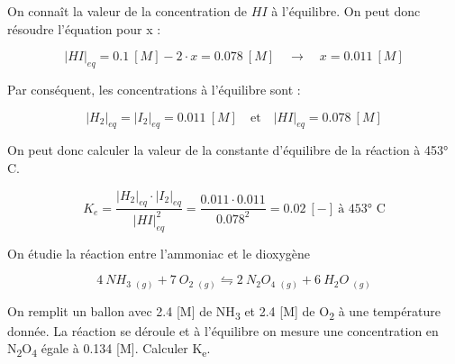 \documentclass[
  11pt,
  a4paper,
  openany]{book}
\begin{document}
On connaît la valeur de la concentration de \(HI\) à l'équilibre. On peut donc résoudre l'équation pour x :

\[
  |HI|_{eq} = 0.1\ [M] - 2 \cdot x = 0.078\ [M] \quad \rightarrow \quad x = 0.011\ [M]
\]

Par conséquent, les concentrations à l'équilibre sont :

\[
  |H_2|_{eq} = |I_2|_{eq} = 0.011\ [M] \quad \text{et} \quad |HI|_{eq} = 0.078\ [M]
\]

On peut donc calculer la valeur de la constante d'équilibre de la réaction à 453° C.

\[
  K_{e} = \frac{|H_2|_{eq} \cdot |I_2|_{eq}}{|HI|_{eq}^2} = \frac{0.011 \cdot 0.011}{0.078^2} = 0.02\ [-]\ \text{à 453° C}
\]

\clearpage

\begin{Exercise}

On étudie la réaction entre l'ammoniac et le dioxygène

\[
  4\ NH_3\ _{(g)} + 7\ O_2\ _{(g)} \leftrightharpoons 2\ N_2O_4\ _{(g)} + 6\ H_2O\ _{(g)}
\]

On remplit un ballon avec 2.4 {[}M{]} de NH\textsubscript{3} et 2.4 {[}M{]} de O\textsubscript{2} à une température donnée. La réaction se déroule et à l'équilibre on mesure une concentration en N\textsubscript{2}O\textsubscript{4} égale à 0.134 {[}M{]}. Calculer K\textsubscript{e}.


\end{Exercise}
\end{document}
